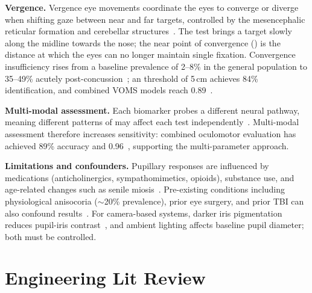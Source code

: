 \noindent\textbf{Vergence.} Vergence eye movements coordinate the eyes to converge or diverge when shifting gaze between near and far targets, controlled by the mesencephalic reticular formation and cerebellar structures~\cite{searle2016vergence}. The test brings a target slowly along the midline towards the nose; the near point of convergence () is the distance at which the eyes can no longer maintain single fixation. Convergence insufficiency rises from a baseline prevalence of 2--8\% in the general population to 35--49\% acutely post-concussion~\cite{mucha2014voms}; an  threshold of 5\,cm achieves 84\% identification, and combined VOMS models reach  0.89~\cite{mucha2014voms}.

\noindent\textbf{Multi-modal assessment.} Each biomarker probes a different neural pathway, meaning different patterns of  may affect each test independently~\cite{mcdonald2022eye}. Multi-modal assessment therefore increases sensitivity: combined oculomotor evaluation has achieved 89\% accuracy and  0.96~\cite{kelly2019combined}, supporting the multi-parameter approach.

\noindent\textbf{Limitations and confounders.} Pupillary responses are influenced by medications (anticholinergics, sympathomimetics, opioids), substance use, and age-related changes such as senile miosis~\cite{mcdougal2015autonomic, huang2024age}. Pre-existing conditions including physiological anisocoria ($\sim$20\% prevalence), prior eye surgery, and prior TBI can also confound results~\cite{lam1987anisocoria}. For camera-based systems, darker iris pigmentation reduces pupil-iris contrast~\cite{barry2023racially}, and ambient lighting affects baseline pupil diameter; both must be controlled.


\section{Engineering Lit Review}
\label{sec:bg-engineering}

